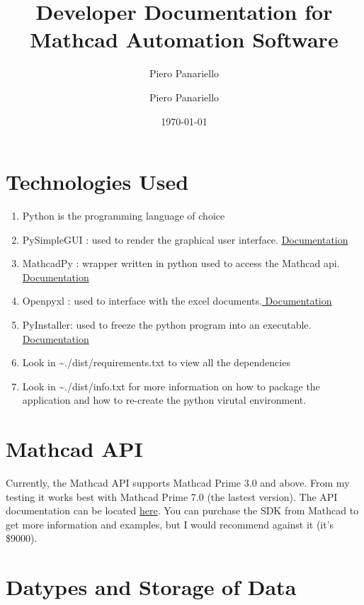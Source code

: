 \documentclass[11pt]{article}
\author{Piero Panariello}
\author{Piero Panariello}
\date{\today}
\title{Developer Documentation for Mathcad Automation Software}
\begin{document}
\maketitle
\tableofcontents


\section{Technologies Used}
\label{sec:org5ccedb8}
\begin{enumerate}
\item Python is the programming language of choice
\item PySimpleGUI : used to render the graphical user interface. \href{https://pysimplegui.readthedocs.io/en/latest/}{Documentation}
\item MathcadPy : wrapper written in python used to access the Mathcad api. \href{https://github.com/MattWoodhead/MathcadPy/blob/master/MathcadPy/\_application.py}{Documentation}
\item Openpyxl : used to interface with the excel documents.\href{https://openpyxl.readthedocs.io/en/stable/}{ Documentation}
\item PyInstaller: used to freeze the python program into an executable.\href{https://pyinstaller.readthedocs.io/en/stable/}{ Documentation}
\item Look in \textasciitilde{}./dist/requirements.txt to view all the dependencies
\item Look in \textasciitilde{}./dist/info.txt for more information on how to package the application and how to re-create the python virutal environment.
\end{enumerate}

\section{Mathcad API}
\label{sec:orgb3494e4}
Currently, the Mathcad API supports Mathcad Prime 3.0 and above. From my testing it works best with Mathcad Prime 7.0 (the lastest version). The API documentation can be located \href{https://support.ptc.com/help/mathcad/r7.0/en/index.html\#page/PTC\_Mathcad\_Help\%2Fmathcad\_and\_automation\_api.html\%23}{here}. You can purchase the SDK from Mathcad to get more information and examples, but I would recommend against it (it's \$9000).
\section{Datypes and Storage of Data}
\label{sec:org51b5050}
\end{document}
